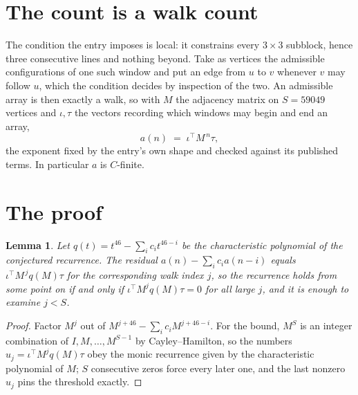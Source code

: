 \documentclass[11pt,a4paper]{article}
\theoremstyle{plain}
\newtheorem{lemma}[theorem]{Lemma}
\theoremstyle{definition}
\begin{document}
\section{The count is a walk count}

The condition the entry imposes is local: it constrains every $3\times3$ subblock, hence three consecutive lines and nothing beyond. Take as
vertices the admissible configurations of one such window and put an edge from $u$ to $v$
whenever $v$ may follow $u$, which the condition decides by inspection of the two. An
admissible array is then exactly a walk, so with $M$ the adjacency matrix on $S=59049$ vertices
and $\iota,\tau$ the vectors recording which windows may begin and end an array,
\[
a(n)\;=\;\iota^{\!\top}M^{\,n}\tau ,
\]
the exponent fixed by the entry's own shape and checked against its published terms. In
particular $a$ is $C$-finite.

\section{The proof}

\begin{lemma}\label{lem:crit}
Let $q(t)=t^{46}-\sum_i c_it^{46-i}$ be the characteristic polynomial of the
conjectured recurrence. The residual $a(n)-\sum_ic_ia(n-i)$ equals
$\iota^{\!\top}M^{\,j}q(M)\tau$ for the corresponding walk index $j$, so the recurrence
holds from some point on if and only if $\iota^{\!\top}M^{j}q(M)\tau=0$ for all large $j$,
and it is enough to examine $j<S$.
\end{lemma}

\begin{proof}
Factor $M^{j}$ out of $M^{j+46}-\sum_ic_iM^{j+46-i}$. For the bound, $M^{S}$
is an integer combination of $I,M,\dots,M^{S-1}$ by Cayley--Hamilton, so the numbers
$u_j=\iota^{\!\top}M^{j}q(M)\tau$ obey the monic recurrence given by the characteristic
polynomial of $M$; $S$ consecutive zeros force every later one, and the last nonzero $u_j$
pins the threshold exactly.
\end{proof}
\end{document}
